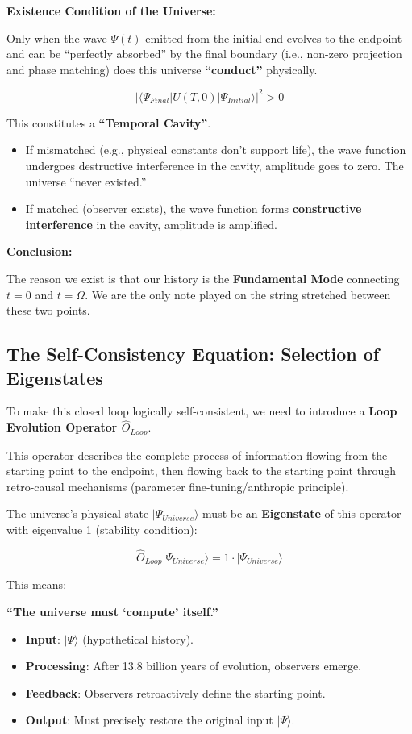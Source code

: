 \textbf{Existence Condition of the Universe:}

Only when the wave $\Psi(t)$ emitted from the initial end evolves to the endpoint and can be ``perfectly absorbed'' by the final boundary (i.e., non-zero projection and phase matching) does this universe \textbf{``conduct''} physically.

\[|\langle \Psi_{Final} | U(T, 0) | \Psi_{Initial} \rangle|^2 > 0\]

This constitutes a \textbf{``Temporal Cavity''}.

\begin{itemize}
\item If mismatched (e.g., physical constants don't support life), the wave function undergoes destructive interference in the cavity, amplitude goes to zero. The universe ``never existed.''

\item If matched (observer exists), the wave function forms \textbf{constructive interference} in the cavity, amplitude is amplified.
\end{itemize}

\textbf{Conclusion:}

The reason we exist is that our history is the \textbf{Fundamental Mode} connecting $t=0$ and $t=\Omega$. We are the only note played on the string stretched between these two points.

\subsection{The Self-Consistency Equation: Selection of Eigenstates}

To make this closed loop logically self-consistent, we need to introduce a \textbf{Loop Evolution Operator $\hat{O}_{Loop}$}.

This operator describes the complete process of information flowing from the starting point to the endpoint, then flowing back to the starting point through retro-causal mechanisms (parameter fine-tuning/anthropic principle).

The universe's physical state $|\Psi_{Universe}\rangle$ must be an \textbf{Eigenstate} of this operator with eigenvalue 1 (stability condition):

\[\hat{O}_{Loop} |\Psi_{Universe}\rangle = 1 \cdot |\Psi_{Universe}\rangle\]

This means:

\textbf{``The universe must `compute' itself.''}

\begin{itemize}
\item \textbf{Input}: $|\Psi\rangle$ (hypothetical history).

\item \textbf{Processing}: After 13.8 billion years of evolution, observers emerge.

\item \textbf{Feedback}: Observers retroactively define the starting point.

\item \textbf{Output}: Must precisely restore the original input $|\Psi\rangle$.
\end{itemize}

